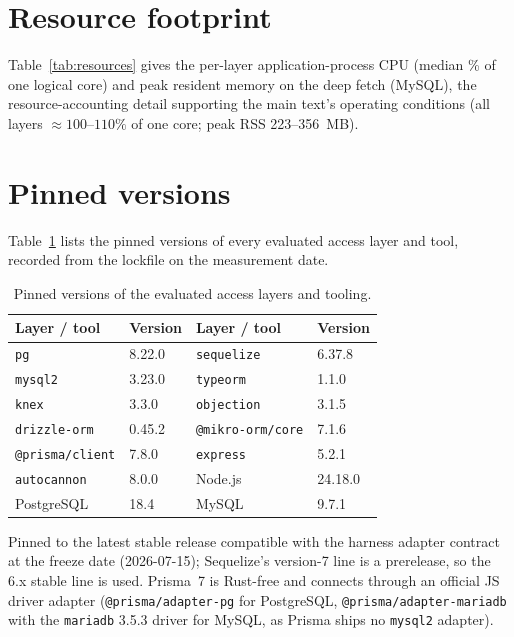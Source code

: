 \documentclass[11pt,a4paper]{article}
\newcommand{\tabledir}{tables/}
\begin{document}


\section{Resource footprint}
\label{sup:resources}
Table~\ref{tab:resources} gives the per-layer application-process CPU (median \%
of one logical core) and peak resident memory on the deep fetch
(MySQL), the resource-accounting detail supporting the main text's operating conditions
(all layers $\approx100$--$110\%$ of one core; peak RSS 223--356~MB).



\section{Pinned versions}
\label{sup:versions}
Table~\ref{tab:versions} lists the pinned versions of every evaluated access layer
and tool, recorded from the lockfile on the measurement date.

\begin{table}[htbp]
  \centering
  \caption{Pinned versions of the evaluated access layers and tooling.}
  \label{tab:versions}
  \begin{tabular}{l l l l}
    \toprule
    Layer / tool & Version & Layer / tool & Version \\
    \midrule
    \texttt{pg}         & 8.22.0  & \texttt{sequelize}      & 6.37.8 \\
    \texttt{mysql2}     & 3.23.0  & \texttt{typeorm}        & 1.1.0  \\
    \texttt{knex}       & 3.3.0   & \texttt{objection}      & 3.1.5  \\
    \texttt{drizzle-orm}& 0.45.2  & \texttt{@mikro-orm/core}& 7.1.6  \\
    \texttt{@prisma/client} & 7.8.0 & \texttt{express}     & 5.2.1  \\
    \texttt{autocannon} & 8.0.0   & Node.js                 & 24.18.0 \\
    PostgreSQL          & 18.4    & MySQL                   & 9.7.1  \\
    \bottomrule
  \end{tabular}

  \vspace{2pt}
  \footnotesize Pinned to the latest stable release compatible with the harness
  adapter contract at the freeze date (2026-07-15); Sequelize's version-7 line is
  a prerelease, so the 6.x stable line is used. Prisma~7 is Rust-free and connects
  through an official JS driver adapter (\texttt{@prisma/adapter-pg} for PostgreSQL,
  \texttt{@prisma/adapter-mariadb} with the \texttt{mariadb} 3.5.3 driver for MySQL,
  as Prisma ships no \texttt{mysql2} adapter).
\end{table}
\end{document}
